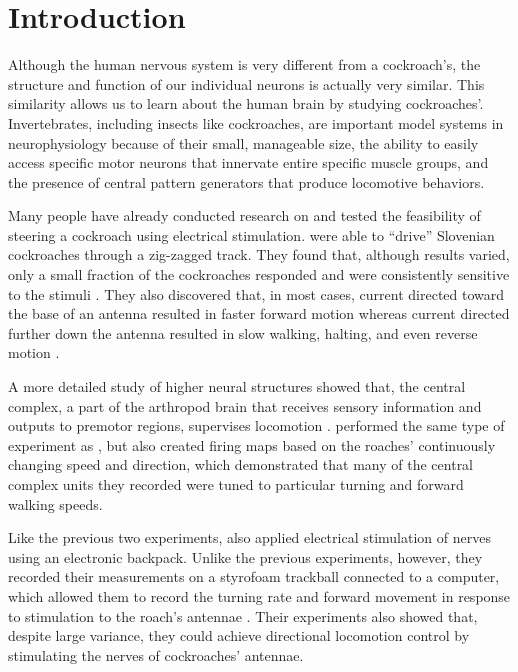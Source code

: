 \section{Introduction}


Although the human nervous system is very different from a cockroach’s, the structure and function of our individual neurons is actually very similar. This similarity allows us to learn about the human brain by studying cockroaches'. Invertebrates, including insects like cockroaches, are important model systems in neurophysiology because of their small, manageable size, the ability to easily access specific motor neurons that innervate entire specific muscle groups, and the presence of central pattern generators that produce locomotive behaviors. 


Many people have already conducted research on and tested the feasibility of steering a cockroach using electrical stimulation. \citet{moore1998directed} were able to ``drive'' Slovenian cockroaches through a zig-zagged track. They found that, although results varied, only a small fraction of the cockroaches responded and were consistently sensitive to the stimuli \citep{moore1998directed}. They also discovered that, in most cases, current directed toward the base of an antenna resulted in faster forward motion whereas current directed further down the antenna resulted in slow walking, halting, and even reverse motion \citep{moore1998directed}.

A more detailed study of higher neural structures showed that, the central complex, a part of the arthropod brain that receives sensory information and outputs to premotor regions, supervises locomotion \citep{guo2013neural}. \citet{guo2013neural} performed the same type of experiment as \citet{moore1998directed}, but also created firing maps based on the roaches' continuously changing speed and direction, which demonstrated that many of the central complex units they recorded were tuned to particular turning and forward walking speeds.

Like the previous two experiments, \citet{holzer1997locomotion} also applied electrical stimulation of nerves using an electronic backpack. Unlike the previous experiments, however, they recorded their measurements on a styrofoam trackball connected to a computer, which allowed them to record the turning rate and forward movement in response to stimulation to the roach's antennae \citep{holzer1997locomotion}. Their experiments also showed that, despite large variance, they could achieve directional locomotion control by stimulating the nerves of cockroaches' antennae.

